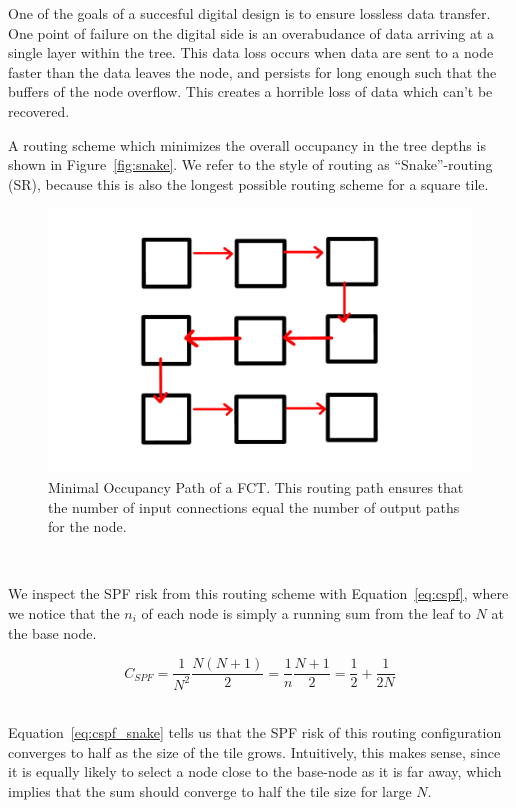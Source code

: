 One of the goals of a succesful digital design is to ensure lossless data transfer.
One point of failure on the digital side is an overabudance of data arriving at a single layer within the tree.
This data loss occurs when data are sent to a node faster than the data leaves the node, and persists for long enough such that the buffers of the node overflow.
This creates a horrible loss of data which can't be recovered.

A routing scheme which minimizes the overall occupancy in the tree depths is shown in Figure~\ref{fig:snake}.
We refer to the style of routing as ``Snake''-routing (SR), because this is also the longest possible routing scheme for a square tile.

\begin{figure}[]
\centering
\includegraphics[width=\textwidth]{images/snakeroute.pdf}
\caption{Minimal Occupancy Path of a FCT. This routing path ensures that the number of input connections equal the number of output paths for the node.}
\end{figure}~\label{fig:snake}

We inspect the SPF risk from this routing scheme with Equation~\ref{eq:cspf}, where we notice that the $n_{i}$ of each node is simply a running sum from the leaf to $N$ at the base node.

\begin{equation}
  C_{SPF} = \frac{1}{N^{2}}\frac{N(N+1)}{2} = \frac{1}{n}\frac{N+1}{2} = \frac{1}{2} + \frac{1}{2N}
\end{equation}~\label{eq:cspf_snake}

Equation~\ref{eq:cspf_snake} tells us that the SPF risk of this routing configuration converges to half as the size of the tile grows.
Intuitively, this makes sense, since it is equally likely to select a node close to the base-node as it is far away, which implies that the sum should converge to half the tile size for large $N$.

